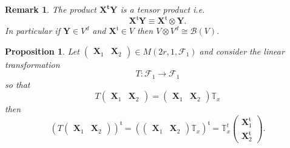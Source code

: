 \documentclass[aps, preprint]{revtex4}
\newtheorem{proposition}[theorem]{Proposition}
\newtheorem{remark}[theorem]{Remark}
\begin{document}
\begin{remark}
The product $\mathbf{X}^{\mathbf{t}} \mathbf{Y}$ is a tensor product i.e.
\begin{equation}\mathbf{X}^{\mathfrak{t}} \mathbf{Y} \equiv \mathbf{X}^{\mathfrak{t}} \otimes \mathbf{Y}\text{.}
\end{equation}In particular if $\mathbf{Y} \in V^{d}$ and $\mathbf{X}^{\mathfrak{t}} \in V$ then $V \otimes V^{d} \cong \mathcal{B} \left (V\right )\text{.}$ 
\end{remark}


\begin{proposition}
Let $\left (\begin{array}{cc}\mathbf{X}_{1} & \mathbf{X}_{2}\end{array}\right ) \in M \left (2 r ,1 ,\mathcal{F}_{1}\right )\;$and consider the linear transformation
\begin{equation}T :\mathcal{F}_{1} \rightarrow \mathcal{F}_{1}
\end{equation}so that
\begin{equation}T \left (\begin{array}{cc}\mathbf{X}_{1} & \mathbf{X}_{2}\end{array}\right ) =\left (\begin{array}{cc}\mathbf{X}_{1} & \mathbf{X}_{2}\end{array}\right ) \mathbb{T}_{x}
\end{equation}then
\begin{equation}\left (T \left (\begin{array}{cc}\mathbf{X}_{1} & \mathbf{X}_{2}\end{array}\right )\right )^{\mathfrak{t}} =\left (\left (\begin{array}{cc}\mathbf{X}_{1} & \mathbf{X}_{2}\end{array}\right ) \mathbb{T}_{x}\right )^{\mathfrak{t}} =\mathbb{T}_{x}^{t} \left (\begin{array}{c}\mathbf{X}_{1}^{\mathfrak{t}} \\
\mathbf{X}_{2}^{\mathfrak{t}}\end{array}\right )\text{.}
\end{equation}



\end{proposition}
\end{document}
